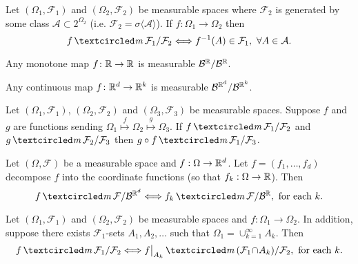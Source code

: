 \begin{theorem}
\label{thm: GaE}
Let $(\Omega_1, \mathcal F_1)$ and $(\Omega_2,\mathcal F_2)$ be  measurable spaces where $\mathcal F_2$ is generated by some class $\mathcal A\subset 2^{\Omega_2}$ (i.e. $\mathcal F_2=\sigma\langle \mathcal A\rangle$). If $f:\Omega_1\rightarrow \Omega_2$ then
\[ f \mcirc \mathcal F_1/\mathcal F_2 \Longleftrightarrow f^{-1}(A)\in\mathcal F_1,\,\, \forall A\in\mathcal A.\]
\end{theorem}



\begin{corollary}
Any monotone map $f\colon \Bbb R\rightarrow \Bbb R$ is measurable $\mathcal B^{\Bbb R}/\mathcal B^{\Bbb R}$.
\end{corollary}

\begin{corollary}
Any continuous map $f\colon \Bbb R^d\rightarrow \Bbb R^k$ is measurable $\mathcal B^{\Bbb R^d}/\mathcal B^{\Bbb R^k}$.
\end{corollary}




\begin{theorem}
\label{thm: composition of measurable}
Let $(\Omega_1,\mathcal F_1)$, $(\Omega_2,\mathcal F_2)$ and $(\Omega_3,\mathcal F_3)$ be measurable spaces. Suppose $f$ and $g$ are functions sending $\Omega_1\overset{f} \longmapsto \Omega_2 \overset{g}\longmapsto \Omega_3$. If $f\mcirc \mathcal F_1/\mathcal F_2$ and $g\mcirc  \mathcal F_2/\mathcal F_3$ then $g\circ f \mcirc\mathcal F_1/\mathcal F_3$.
\end{theorem}


\begin{corollary}
\label{coordM}
Let $(\Omega,\mathcal F)$ be a measurable space and $f:\Omega\rightarrow \Bbb R^d$. Let $f=(f_1,\ldots, f_d)$ decompose $f$ into the coordinate functions (so that $f_k:\Omega\rightarrow \Bbb R$). Then
\[ f\mcirc \mathcal F/\mathcal B^{\Bbb R^d}\Longleftrightarrow  f_k\mcirc \mathcal F/\mathcal B^{\Bbb R}, \text{ for each $k$.} \]
\end{corollary}



\begin{theorem}
Let $(\Omega_1, \mathcal F_1)$ and $(\Omega_2,\mathcal F_2)$ be measurable spaces and $f\colon \Omega_1 \rightarrow \Omega_2$.  In addition, suppose there exists $\mathcal F_1$-sets $A_1,A_2,\ldots$ such that $\Omega_1 = \cup_{k=1}^\infty A_k$. Then
\[ f\mcirc \mathcal F_1/\mathcal F_2 \Longleftrightarrow  f\bigr|_{A_k} \mcirc (\mathcal F_1\!\cap\! A_k)/\mathcal F_2, \text{ for each $k$.} \]
\end{theorem}

